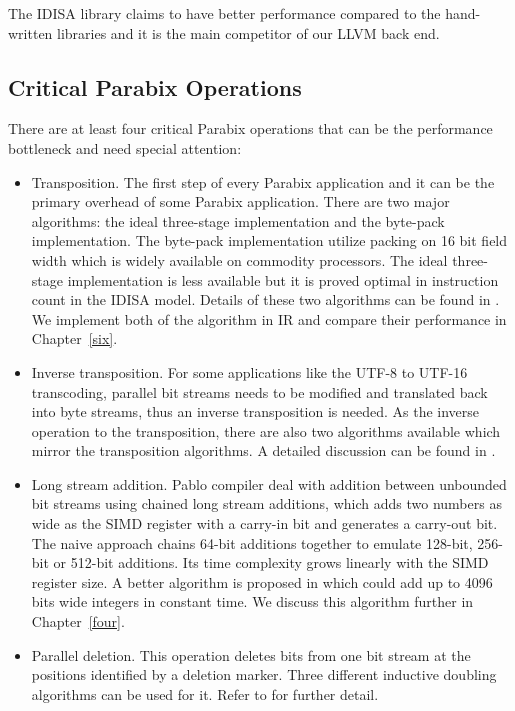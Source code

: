 The IDISA library claims to have better performance compared to the hand-written libraries and it is the main competitor of our LLVM back end.

\subsection{Critical Parabix Operations}
There are at least four critical Parabix operations that can be the performance bottleneck and need special attention:
\begin{itemize}
    \item Transposition. The first step of every Parabix application and it can be the primary overhead of some Parabix application. There are two major algorithms: the ideal three-stage implementation and the byte-pack implementation. The byte-pack implementation utilize packing on 16 bit field width which is widely available on commodity processors. The ideal three-stage implementation is less available but it is proved optimal in instruction count in the IDISA model. Details of these two algorithms can be found in \cite{inductive_doubling_principle}. We implement both of the algorithm in IR and compare their performance in Chapter~\ref{six}.

    \item Inverse transposition. For some applications like the UTF-8 to UTF-16 transcoding, parallel bit streams needs to be modified and translated back into byte streams, thus an inverse transposition is needed. As the inverse operation to the transposition, there are also two algorithms available which mirror the transposition algorithms. A detailed discussion can be found in \cite{rob_u8u16}.

    \item Long stream addition. Pablo compiler deal with addition between unbounded bit streams using chained long stream additions, which adds two numbers as wide as the SIMD register with a carry-in bit and generates a carry-out bit. The naive approach chains 64-bit additions together to emulate 128-bit, 256-bit or 512-bit additions. Its time complexity grows linearly with the SIMD register size. A better algorithm is proposed in \cite{rob_regex} which could add up to 4096 bits wide integers in constant time. We discuss this algorithm further in Chapter~\ref{four}.

    \item Parallel deletion. This operation deletes bits from one bit stream at the positions identified by a deletion marker. Three different inductive doubling algorithms can be used for it. Refer to \cite{rob_u8u16} for further detail.
\end{itemize}

